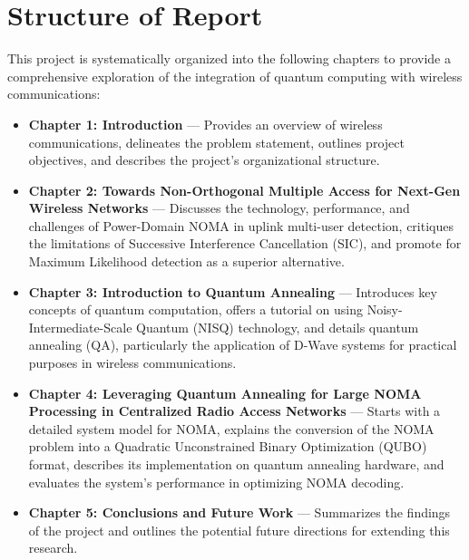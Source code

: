 \section{Structure of Report}\label{structure-of-report}

This project is systematically organized into the following chapters to provide a comprehensive exploration of the integration of quantum computing with wireless communications:

\begin{itemize}
    \item \textbf{Chapter 1: Introduction} --- Provides an overview of wireless communications, delineates the problem statement, outlines project objectives, and describes the project's organizational structure.
    \item \textbf{Chapter 2: Towards Non-Orthogonal Multiple Access
for Next-Gen Wireless Networks} --- Discusses the technology, performance, and challenges of Power-Domain NOMA in uplink multi-user detection, critiques the limitations of Successive Interference Cancellation (SIC), and promote for Maximum Likelihood detection as a superior alternative.
    \item \textbf{Chapter 3: Introduction to Quantum Annealing} --- Introduces key concepts of quantum computation, offers a tutorial on using Noisy-Intermediate-Scale Quantum (NISQ) technology, and details quantum annealing (QA), particularly the application of D-Wave systems for practical purposes in wireless communications.
    \item \textbf{Chapter 4: Leveraging Quantum Annealing for
Large NOMA Processing in Centralized
Radio Access Networks} --- Starts with a detailed system model for NOMA, explains the conversion of the NOMA problem into a Quadratic Unconstrained Binary Optimization (QUBO) format, describes its implementation on quantum annealing hardware, and evaluates the system’s performance in optimizing NOMA decoding.
    \item \textbf{Chapter 5: Conclusions and Future Work} --- Summarizes the findings of the project and outlines the potential future directions for extending this research.
\end{itemize}

